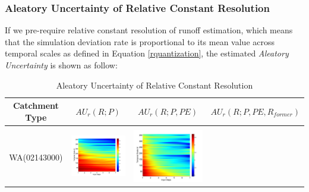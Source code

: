 \documentclass[draft,wrr]{AGUTeX}
\begin{document}
\begin{article}
\subsubsection{Aleatory Uncertainty of Relative Constant Resolution}
If we pre-require relative constant resolution of runoff estimation, which means that the simulation deviation rate is proportional to its mean value across temporal scales as  defined in Equation \eqref{rquantization}, the estimated \emph{Aleatory Uncertainty} is shown as follow:
\begin{table}[H]  \small 
\caption{Aleatory Uncertainty of Relative Constant Resolution}
\label{table:RAU}
\centering
\begin{tabular}{cccc}
\hline
\textbf{Catchment Type}&\textbf{$AU_r(R;P)$}&\textbf{$AU_r(R;P,PE)$}&\textbf{$AU_r(R;P,PE,R_{former})$}\\
\hline
\\
WA(02143000)
&\begin{minipage}{.3\textwidth}\includegraphics[width=\linewidth]{resultgraph/02143000p_rela.png}\end{minipage}
&\begin{minipage}{.3\textwidth}\includegraphics[width=\linewidth]{resultgraph/02143000pep_rela.png}\end{minipage}

\end{tabular}
\end{table}
\end{article}
\end{document}
